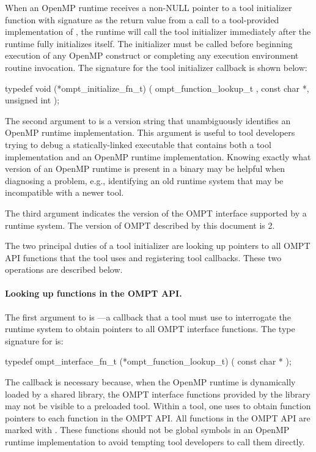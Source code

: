 \documentclass{article}
\begin{document}
When an OpenMP runtime receives a non-NULL pointer to a tool initializer function with signature  as the return value from a call to a tool-provided implementation of , the runtime will call the tool initializer immediately after the runtime fully initializes itself. The initializer must be called before beginning execution of any OpenMP construct or completing any execution environment  routine invocation.  The signature for the tool initializer callback is shown below:

\begin{boxedcode}
typedef void (*ompt\_initialize\_fn\_t) (
  ompt\_function\_lookup\_t ,
  const char *, 
  unsigned int 
);
\end{boxedcode}
The second argument to   is a version string that unambiguously identifies an OpenMP runtime implementation. This argument is useful to tool developers trying to debug a statically-linked executable that contains both a tool implementation and an OpenMP runtime implementation. Knowing exactly what version of an OpenMP runtime is present in a binary may be helpful when diagnosing a problem, e.g., identifying an old runtime system that may be incompatible with a newer tool.

The third argument  indicates the version of the OMPT interface supported by a runtime system.
The version of OMPT described by this document is 2.

The two principal duties of a tool initializer are looking up pointers to all OMPT API functions that the tool uses and registering tool callbacks.  These two operations are described below.

\paragraph{Looking up functions in the OMPT API.} The first argument to  is ---a callback that a tool must use to interrogate the runtime system to obtain pointers to all OMPT interface functions.
The type signature for   is:

\begin{boxedcode}
typedef ompt\_interface\_fn\_t (*ompt\_function\_lookup\_t) (
  const char *
);
\end{boxedcode}

\noindent
The  callback is necessary because, when the OpenMP runtime is dynamically loaded by a shared library, the OMPT interface functions provided by the library may not be visible to a preloaded tool. Within a tool, one uses  to obtain function pointers to each function in the OMPT API.  All functions in the OMPT API are marked with . These functions should not be global symbols in an OpenMP runtime implementation to avoid tempting tool developers to call them directly. 
\end{document}
